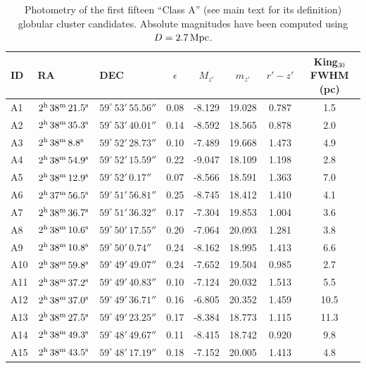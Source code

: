 \documentclass[useAMS,usenatbib]{mn2e}
\begin{document}
\lipsum[1]



\begin{table}
 \centering
 \caption{Photometry of the first fifteen ``Class A'' (see main text for its definition) globular cluster candidates. Absolute magnitudes have been computed using $D = 2.7\,\rm{Mpc}$.}
\label{tab:class_a}  
\begin{tabular}{lllccccc}
	\hline
	ID & RA & DEC & $\epsilon$ & $M_{z'}$ & $m_{z'}$ & $r'-z'$ & King$_{30}$ FWHM (pc) \\
	\hline
	A1 & $2^{\rm{h}}\,38^{\rm{m}}\,21.5^{\rm{s}}$ & $59^\circ\,53'\,55.56''$ & 0.08 & -8.129 & 19.028 & 0.787 & 1.5 \\
	A2 & $2^{\rm{h}}\,38^{\rm{m}}\,35.3^{\rm{s}}$ & $59^\circ\,53'\,40.01''$ & 0.14 & -8.592 & 18.565 & 0.878 & 2.0 \\
	A3 & $2^{\rm{h}}\,38^{\rm{m}}\,8.8^{\rm{s}}$ & $59^\circ\,52'\,28.73''$ & 0.10 & -7.489 & 19.668 & 1.473 & 4.9 \\
	A4 & $2^{\rm{h}}\,38^{\rm{m}}\,54.9^{\rm{s}}$ & $59^\circ\,52'\,15.59''$ & 0.22 & -9.047 & 18.109 & 1.198 & 2.8 \\
	A5 & $2^{\rm{h}}\,38^{\rm{m}}\,12.9^{\rm{s}}$ & $59^\circ\,52'\,0.17''$ & 0.07 & -8.566 & 18.591 & 1.363 & 7.0 \\
	A6 & $2^{\rm{h}}\,37^{\rm{m}}\,56.5^{\rm{s}}$ & $59^\circ\,51'\,56.81''$ & 0.25 & -8.745 & 18.412 & 1.410 & 4.1 \\
	A7 & $2^{\rm{h}}\,38^{\rm{m}}\,36.7^{\rm{s}}$ & $59^\circ\,51'\,36.32''$ & 0.17 & -7.304 & 19.853 & 1.004 & 3.6 \\
	A8 & $2^{\rm{h}}\,38^{\rm{m}}\,10.6^{\rm{s}}$ & $59^\circ\,50'\,17.55''$ & 0.20 & -7.064 & 20.093 & 1.281 & 3.8 \\
	A9 & $2^{\rm{h}}\,38^{\rm{m}}\,10.8^{\rm{s}}$ & $59^\circ\,50'\,0.74''$ & 0.24 & -8.162 & 18.995 & 1.413 & 6.6 \\
	A10 & $2^{\rm{h}}\,38^{\rm{m}}\,59.8^{\rm{s}}$ & $59^\circ\,49'\,49.07''$ & 0.24 & -7.652 & 19.504 & 0.985 & 2.7 \\
	A11 & $2^{\rm{h}}\,38^{\rm{m}}\,37.2^{\rm{s}}$ & $59^\circ\,49'\,40.83''$ & 0.10 & -7.124 & 20.032 & 1.513 & 5.5 \\
	A12 & $2^{\rm{h}}\,38^{\rm{m}}\,37.0^{\rm{s}}$ & $59^\circ\,49'\,36.71''$ & 0.16 & -6.805 & 20.352 & 1.459 & 10.5 \\
	A13 & $2^{\rm{h}}\,38^{\rm{m}}\,27.5^{\rm{s}}$ & $59^\circ\,49'\,23.25''$ & 0.17 & -8.384 & 18.773 & 1.115 & 11.3 \\
	A14 & $2^{\rm{h}}\,38^{\rm{m}}\,49.3^{\rm{s}}$ & $59^\circ\,48'\,49.67''$ & 0.11 & -8.415 & 18.742 & 0.920 & 9.8 \\
	A15 & $2^{\rm{h}}\,38^{\rm{m}}\,43.5^{\rm{s}}$ & $59^\circ\,48'\,17.19''$ & 0.18 & -7.152 & 20.005 & 1.413 & 4.8 \\
	\hline
\end{tabular}
\end{table}
\end{document}
